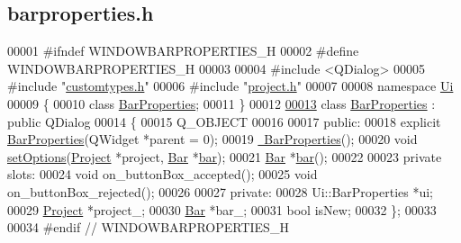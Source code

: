 \hypertarget{barproperties_8h_source}{}\subsection{barproperties.\+h}
\label{barproperties_8h_source}

\begin{DoxyCode}
00001 \textcolor{preprocessor}{#ifndef WINDOWBARPROPERTIES\_H}
00002 \textcolor{preprocessor}{#define WINDOWBARPROPERTIES\_H}
00003 
00004 \textcolor{preprocessor}{#include <QDialog>}
00005 \textcolor{preprocessor}{#include "\hyperlink{customtypes_8h}{customtypes.h}"}
00006 \textcolor{preprocessor}{#include "\hyperlink{project_8h}{project.h}"}
00007 
00008 \textcolor{keyword}{namespace }\hyperlink{namespace_ui}{Ui}
00009 \{
00010 \textcolor{keyword}{class }\hyperlink{class_bar_properties}{BarProperties};
00011 \}
00012 
\hypertarget{barproperties_8h_source_l00013}{}\hyperlink{class_bar_properties}{00013} \textcolor{keyword}{class }\hyperlink{class_bar_properties}{BarProperties} : \textcolor{keyword}{public} QDialog
00014 \{
00015   Q\_OBJECT
00016 
00017 \textcolor{keyword}{public}:
00018   \textcolor{keyword}{explicit} \hyperlink{class_bar_properties_a7c14a54f430cabfe872869799076025b}{BarProperties}(QWidget *parent = 0);
00019   \hyperlink{class_bar_properties_a639b4da849970025a2935ee965d6a465}{~BarProperties}();
00020   \textcolor{keywordtype}{void} \hyperlink{class_bar_properties_a80cba99404820272603c4da8fb708c05}{setOptions}(\hyperlink{class_project}{Project} *project, \hyperlink{class_bar}{Bar} *\hyperlink{class_bar_properties_a65d09e7315764cd4ad33b5a0ded32090}{bar});
00021   \hyperlink{class_bar}{Bar} *\hyperlink{class_bar_properties_a65d09e7315764cd4ad33b5a0ded32090}{bar}();
00022 
00023 \textcolor{keyword}{private} slots:
00024   \textcolor{keywordtype}{void} on\_buttonBox\_accepted();
00025   \textcolor{keywordtype}{void} on\_buttonBox\_rejected();
00026 
00027 \textcolor{keyword}{private}:
00028   Ui::BarProperties *ui;
00029   \hyperlink{class_project}{Project} *project\_;
00030   \hyperlink{class_bar}{Bar} *bar\_;
00031   \textcolor{keywordtype}{bool} isNew;
00032 \};
00033 
00034 \textcolor{preprocessor}{#endif // WINDOWBARPROPERTIES\_H}
\end{DoxyCode}
